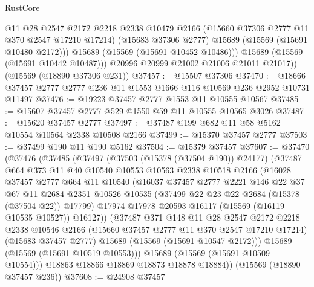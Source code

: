 \begin{lexlean}{RustCore}
\begin{coremodule}
              @11
              @28
              @2547
              @2172
              @2218
              @2338
              @10479
              @2166
              (@15660 @37306 @2777 @11 @370 @2547 @17210 @17214)
              (@15683 @37306 @2777)
              @15689
              (@15569 (@15691 @10480 @2172)))
            @15689
            (@15569 (@15691 @10452 @10486)))
          @15689
          (@15569 (@15691 @10442 @10487)))
        @20996
        @20999
        @21002
        @21006
        @21011
        @21017))
    (@15569 (@18890 @37306 @231))
@37457 := @15507 @37306
@37470 := @18666 @37457 @2777 @2777 @236 @11 @1553 @1666 @116 @10569 @236 @2952 @10731 @11497
@37476 := @19223 @37457 @2777 @1553 @11 @10555 @10567
@37485 := @15607 @37457 @2777 @529 @1550 @59 @11 @10555 @10565 @3026
@37487 := @15620 @37457 @2777
@37497 := @37487 @199 @682 @11 @58 @5162 @10554 @10564 @2338 @10508 @2166
@37499 := @15370 @37457 @2777
@37503 := @37499 @190 @11 @190 @5162
@37504 := @15379 @37457
@37607 := @37470
    (@37476
      (@37485
        (@37497
          (@37503 (@15378 (@37504 @190)) @24177)
          (@37487
            @664
            @373
            @11
            @40
            @10540
            @10553
            @10563
            @2338
            @10518
            @2166
            (@16028
              @37457
              @2777
              @664
              @11
              @10540
              (@16037
                @37457
                @2777
                @2221
                @146
                @22
                @37
                @67
                @11
                @2684
                @2351
                @10526
                @10535
                (@37499 @22 @23 @22 @2684 (@15378 (@37504 @22)) @17799)
                @17974
                @17978
                @20593
                @16117
                (@15569 (@16119 @10535 @10527))
                @16127))
            (@37487
              @371
              @148
              @11
              @28
              @2547
              @2172
              @2218
              @2338
              @10546
              @2166
              (@15660 @37457 @2777 @11 @370 @2547 @17210 @17214)
              (@15683 @37457 @2777)
              @15689
              (@15569 (@15691 @10547 @2172)))
            @15689
            (@15569 (@15691 @10519 @10553)))
          @15689
          (@15569 (@15691 @10509 @10554)))
        @18863
        @18866
        @18869
        @18873
        @18878
        @18884))
    (@15569 (@18890 @37457 @236))
@37608 := @24908 @37457

\end{coremodule}
\end{lexlean}
